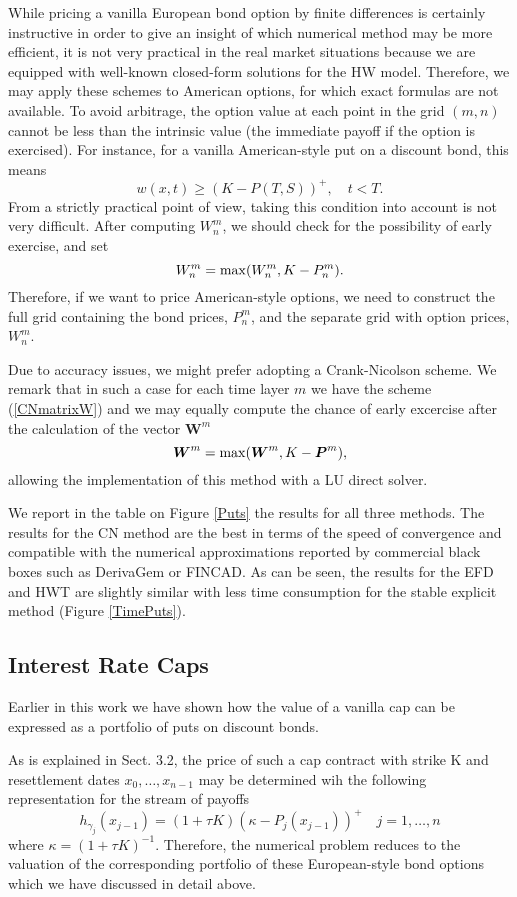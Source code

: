 While pricing a vanilla European bond option by finite differences is
certainly instructive in order to give an insight of which numerical
method may be more efficient, it is not very practical in the real
market situations because we are equipped with well-known closed-form
solutions for the HW model. Therefore, we may apply these schemes to
American options, for which exact formulas are not available. To avoid
arbitrage, the option value at each point in the grid $(m,n)$ cannot
be less than the intrinsic value (the immediate payoff if the option
is exercised). For instance, for a vanilla American-style put on a
discount bond, this means
$$
w(x,t) \geq  ( K - P(T,S) )^+, \quad t< T.
$$
From a strictly practical point of view, taking this condition into
account is not very difficult. After computing $W^m_n$, we should
check for the possibility of early exercise, and set
$$
W^m_n = {\rm max}( W^m_n , K - P^m_n).
$$
Therefore, if we want to price American-style options, we need to
construct the full grid containing the bond prices, $P^m_n$, and the
separate grid with option prices, $W^m_n$. 

Due to accuracy issues, we might prefer adopting a Crank-Nicolson
scheme. We remark that in such a case for each time layer $m$ we have
the scheme (\ref{CNmatrixW}) and we may equally compute the chance of
early excercise after the calculation of the vector $\boldsymbol{W}^m$ 
$$
\boldsymbol{W}^m = {\rm max}( \boldsymbol{W}^m, K-\boldsymbol{P}^m),
$$
allowing the implementation of this method with a LU direct solver. 

We report in the table on Figure \ref{Puts} the results for all three
methods. The results for the CN method are the best in terms of the speed
of convergence and compatible with the numerical approximations
reported by commercial black boxes such as DerivaGem or FINCAD. As can
be seen, the results for the EFD and HWT are slightly similar with
less time consumption for the stable explicit method (Figure
\ref{TimePuts}).

\subsection*{Interest Rate Caps}
Earlier in this work we have shown how the value of a vanilla cap can
be expressed as a portfolio of puts on discount bonds. 

As is explained in Sect. 3.2, the price of such a cap contract with
strike K and resettlement dates $x_0, \dots, x_{n-1}$ may be
determined wih the following representation for the stream of payoffs 
\begin{equation}
h_{\gamma_j}(x_{j-1})=(1+\tau K) \left(\kappa-P_j(x_{j-1})\right)^+
\quad j=1, \dots, n
\end{equation}
where $\kappa = (1+\tau K)^{-1}$. Therefore, the numerical problem
reduces to the valuation of the corresponding portfolio of these
European-style bond options which we have discussed in detail above.

